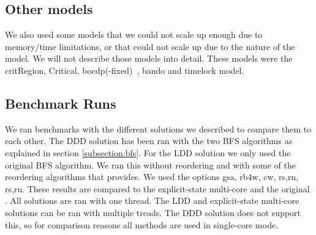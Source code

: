 \subsection{Other models}
We also used some models that we could not scale up enough due to memory/time limitations, or that could not scale up due to the nature of the model. We will not describe those models into detail. These models were the critRegion, Critical, bocdp(-fixed)~\cite{641264}, bando and timelock model.

\subsection{Benchmark Runs}
We ran benchmarks with the different solutions we described to compare them to each other. The DDD solution has been ran with the two BFS algorithms as explained in section \ref{subsection:bfs}. For the LDD solution we only used the original BFS algorithm. We ran this without reordering and with some of the reordering algorithms that \ltsmin{} provides. We used the options gsa, rb4w, cw, rs,rn, rs,ru. These results are compared to the explicit-state multi-core \ltsmin{} and the original \uppaal{}. All solutions are ran with one thread. The LDD and explicit-state multi-core solutions can be ran with multiple treads. The DDD solution does not support this, so for comparison reasons all methods are used in single-core mode.
